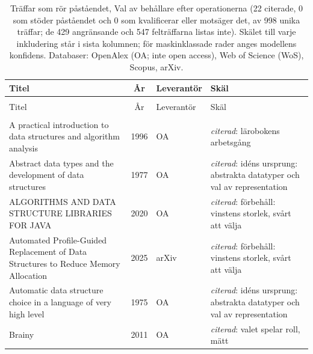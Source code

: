 
\begingroup\footnotesize
\begin{longtable}{@{}%
  >{\raggedright\arraybackslash}p{}c%
  >{\raggedright\arraybackslash}p{}%
  >{\raggedright\arraybackslash}p{}@{}}
\caption{Träffar som rör påståendet, Val av behållare efter operationerna (22 citerade, 0 som stöder påståendet och 0 som kvalificerar eller motsäger det, av 998 unika träffar; de 429 angränsande och 547 felträffarna listas inte). Skälet till varje inkludering står i sista kolumnen; för maskinklassade rader anges modellens konfidens. Databaser: OpenAlex (OA; inte open access), Web of Science (WoS), Scopus, arXiv.}\label{tab:sok-valja}\\
\toprule
Titel & År & Leverantör & Skäl \\
\midrule
\endfirsthead
\multicolumn{4}{@{}l}{\emph{\tablename~\thetable{} (forts.)}}\\
\toprule
Titel & År & Leverantör & Skäl \\
\midrule
\endhead
\midrule \multicolumn{4}{r@{}}{\emph{forts.\ på nästa sida}}\\
\endfoot
\bottomrule
\endlastfoot
A practical introduction to data structures and algorithm analysis & 1996 & OA & \emph{citerad}: lärobokens arbetsgång \\
Abstract data types and the development of data structures & 1977 & OA & \emph{citerad}: idéns ursprung: abstrakta datatyper och val av representation \\
ALGORITHMS AND DATA STRUCTURE LIBRARIES FOR JAVA & 2020 & OA & \emph{citerad}: förbehåll: vinstens storlek, svårt att välja \\
Automated Profile-Guided Replacement of Data Structures to Reduce Memory Allocation & 2025 & arXiv & \emph{citerad}: förbehåll: vinstens storlek, svårt att välja \\
Automatic data structure choice in a language of very high level & 1975 & OA & \emph{citerad}: idéns ursprung: abstrakta datatyper och val av representation \\
Brainy & 2011 & OA & \emph{citerad}: valet spelar roll, mätt \\

\end{longtable}
